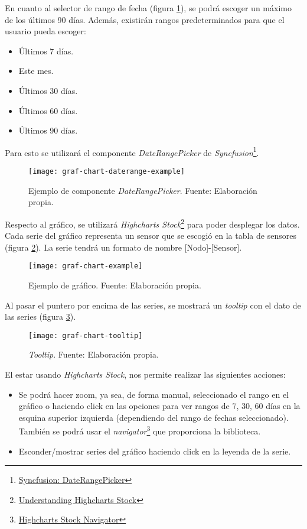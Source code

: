 En cuanto al selector de rango de fecha (figura \ref{fig:graf-chart-daterange-example}), se podrá escoger un máximo de los últimos 90 días. Además, existirán rangos predeterminados para que el usuario pueda escoger:
\begin{itemize}
    \item Últimos 7 días.
    \item Este mes.
    \item Últimos 30 días.
    \item Últimos 60 días.
    \item Últimos 90 días.
\end{itemize}
Para esto se utilizará el componente \textit{DateRangePicker} de \textit{Syncfusion}\footnote{\href{https://ej2.syncfusion.com/react/documentation/daterangepicker/getting-started}{Syncfusion: DateRangePicker}}.
\begin{figure}[H]
	\centering
	\texttt{[image: graf-chart-daterange-example]}
	\caption{\label{fig:graf-chart-daterange-example} Ejemplo de componente \textit{DateRangePicker}. Fuente: Elaboración propia.}
\end{figure}
Respecto al gráfico, se utilizará \textit{Highcharts Stock}\footnote{\href{https://www.highcharts.com/docs/stock/understanding-highcharts-stock}{Understanding Highcharts Stock}} para poder desplegar los datos. Cada serie del gráfico representa un sensor que se escogió en la tabla de sensores (figura \ref{fig:graf-chart-example}). La serie tendrá un formato de nombre [Nodo]-[Sensor].
\begin{figure}[H]
	\centering
	\texttt{[image: graf-chart-example]}
	\caption{\label{fig:graf-chart-example} Ejemplo de gráfico. Fuente: Elaboración propia.}
\end{figure}

Al pasar el puntero por encima de las series, se mostrará un \textit{tooltip} con el dato de las series (figura \ref{fig:graf-chart-tooltip}).
\begin{figure}[H]
	\centering
	\texttt{[image: graf-chart-tooltip]}
	\caption{\label{fig:graf-chart-tooltip} \textit{Tooltip}. Fuente: Elaboración propia.}
\end{figure}
El estar usando \textit{Highcharts Stock}, nos permite realizar las siguientes acciones:
\begin{itemize}
    \item Se podrá hacer zoom, ya sea, de forma manual, seleccionado el rango en el gráfico o haciendo click en las opciones para ver rangos de 7, 30, 60 días en la esquina superior izquierda (dependiendo del rango de fechas seleccionado). También se podrá usar el \textit{navigator}\footnote{\href{https://www.highcharts.com/docs/stock/navigator}{Highcharts Stock Navigator}} que proporciona la biblioteca.
    \item Esconder/mostrar series del gráfico haciendo click en la leyenda de la serie.
\end{itemize}

